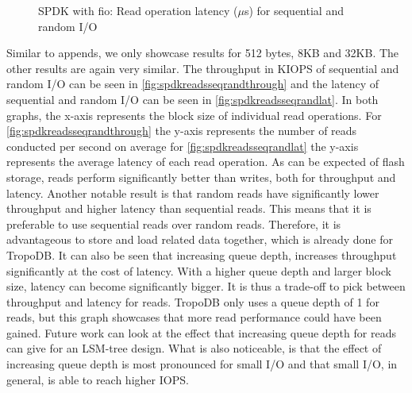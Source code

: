 \begin{figure}[!ht]
    \hspace*{-0.075\textwidth} %
    \raggedleft
    \caption{ SPDK with fio: Read operation latency ($\mu$s) for sequential and random I/O }
    \label{fig:spdkreadsseqrandlat}
\end{figure}

Similar to appends, we only showcase results for 512 bytes, 8KB and 32KB. The other results are again very similar.
The throughput in KIOPS of sequential and random I/O can be seen in \autoref{fig:spdkreadsseqrandthrough} and the latency of sequential and random I/O can be seen in \autoref{fig:spdkreadsseqrandlat}. In both graphs, the x-axis represents the block size of individual read operations. For \autoref{fig:spdkreadsseqrandthrough} the y-axis represents the number of reads conducted per second on average for \autoref{fig:spdkreadsseqrandlat} the y-axis represents the average latency of each read operation. As can be expected of flash storage, reads perform significantly better than writes, both for throughput and latency. Another notable result is that random reads have significantly lower throughput and higher latency than sequential reads. This means that it is preferable to use sequential reads over random reads. Therefore, it is advantageous to store and load related data together, which is already done for TropoDB. It can also be seen that increasing queue depth, increases throughput significantly at the cost of latency. With a higher queue depth and larger block size, latency can become significantly bigger. It is thus a trade-off to pick between throughput and latency for reads. TropoDB only uses a queue depth of 1 for reads, but this graph showcases that more read performance could have been gained. Future work can look at the effect that increasing queue depth for reads can give for an LSM-tree design. What is also noticeable, is that the effect of increasing queue depth is most pronounced for small I/O and that small I/O, in general, is able to reach higher IOPS.     

